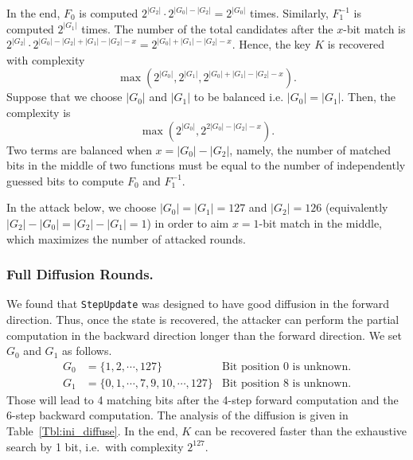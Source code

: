In the end,
$F_0$ is computed $2^{|G_2|} \cdot 2^{|G_0|-|G_2|} = 2^{|G_0|}$ times.
Similarly, $F_1^{-1}$ is computed $2^{|G_1|}$ times. The number of the total candidates after the $x$-bit match is $2^{|G_2|} \cdot 2^{|G_0|-|G_2| + |G_1|-|G_2| - x} = 2^{|G_0| + |G_1| - |G_2| - x}$. Hence, the key $K$ is recovered with complexity $$\max( 2^{|G_0|}, 2^{|G_1|}, 2^{|G_0| + |G_1| - |G_2| - x}).$$
Suppose that we choose $|G_0|$ and $|G_1|$ to be balanced i.e. $|G_0|=|G_1|$. Then, the complexity is $$\max( 2^{|G_0|}, 2^{2|G_0| - |G_2| - x}).$$
Two terms are balanced when $x = |G_0| - |G_2|$, namely, the number of matched bits in the middle of two functions must be equal to the number of independently guessed bits to compute $F_0$ and $F_1^{-1}$.

In the attack below, we choose $|G_0|=|G_1|=127$ and $|G_2|=126$ (equivalently $|G_2|-|G_0| = |G_2|-|G_1| = 1$) in order to aim $x=1$-bit match in the middle, which maximizes the number of attacked rounds.

\subsubsection{Full Diffusion Rounds.}
We found that {\tt StepUpdate} was designed to have good diffusion in the forward direction. Thus, once the state is recovered, the attacker can perform the partial computation in the backward direction longer than the forward direction. We set $G_0$ and $G_1$ as follows.
\begin{align*}
G_0 &= \{1, 2, \cdots, 127\} & \textrm {Bit position 0 is unknown.}\\
G_1 &= \{0, 1, \cdots, 7, 9, 10, \cdots, 127\} & \textrm {Bit position 8 is unknown.}
\end{align*}
Those will lead to 4 matching bits after the 4-step forward computation and the 6-step backward computation. The analysis of the diffusion is given in Table~\ref{Tbl:ini_diffuse}. In the end, $K$ can be recovered faster than the exhaustive search by 1 bit, i.e.~with complexity $2^{127}$.

